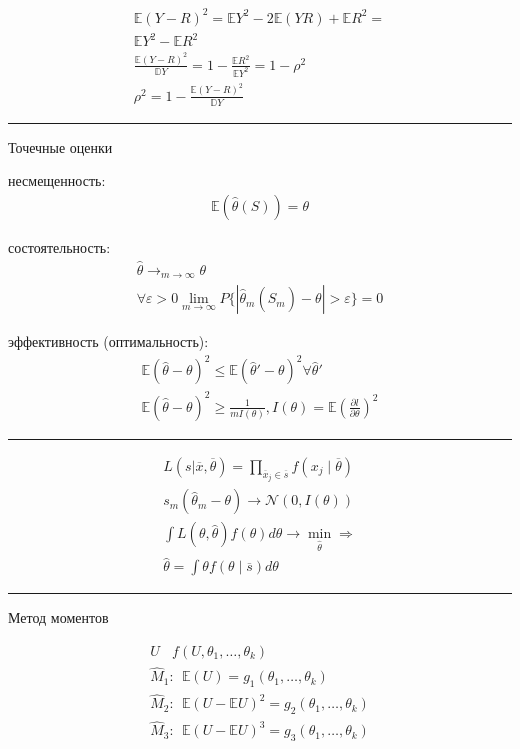 \documentclass{book}
\begin{document}
\begin{gather*}
  \mathbb{E}(Y-R)^2=\mathbb{E}Y^2-2\mathbb{E}(YR)+\mathbb{E}R^2=\\
  \mathbb{E}Y^2-\mathbb{E}R^2\\
  \frac{\mathbb{E}(Y-R)^2}{\mathbb{D}Y}=1-\frac{\mathbb{E}R^2}{\mathbb{E}Y^2}=1-\rho^2\\
  \rho^2=1-\frac{\mathbb{E}(Y-R)^2}{\mathbb{D}Y}
\end{gather*}

\hrule
Точечные оценки

несмещенность: 
\begin{gather*}
  \mathbb{E}(\hat{\theta}(S))=\theta
\end{gather*}

состоятельность: 
\begin{gather*}
  \hat{\theta} \rightarrow_{m\rightarrow\infty}\theta\\
  \forall \varepsilon > 0 \lim_{m\rightarrow \infty} {P\{|\hat{\theta}_m(\hat{S}_m)-\theta|>\varepsilon\}}=0
\end{gather*}

эффективность (оптимальность):
\begin{gather*}
  \mathbb{E}(\hat{\theta}-\theta)^2\leq \mathbb{E}(\hat{\theta}'-\theta)^2 \forall \hat{\theta}'\\
  \mathbb{E}(\hat{\theta}-\theta)^2\geq \frac{1}{mI(\theta)}, I(\theta)=\mathbb{E}\left(\frac{\partial l}{\partial \theta}\right)^2
\end{gather*}

\hrule

\begin{gather*}
  L(s|\overline{x},\overline{\theta})=\prod_{\overline{x}_j \in \overline{s}}^{} {f(x_j\mid \overline{\theta})}\\
  s_m(\hat{\theta}_m-\theta) \rightarrow \mathcal{N}(0, I(\theta))\\
  \int {L(\theta,\hat{\theta})f(\theta)d\theta} \rightarrow \min_{\hat{\theta}} \Rightarrow\\
  \hat{\theta}=\int {\theta f(\theta\mid \overline{s}) d\theta}
\end{gather*}

\hrule
Метод моментов

\begin{gather*}
  U~~~~f(U,\theta_1,\dots,\theta_k)\\
  \hat{M}_1:~~\mathbb{E}(U)=g_1(\theta_1,\dots, \theta_k)\\
  \hat{M}_2:~~\mathbb{E}(U-\mathbb{E}U)^2=g_2(\theta_1,\dots, \theta_k)\\
  \hat{M}_3:~~\mathbb{E}(U-\mathbb{E}U)^3=g_3(\theta_1,\dots, \theta_k)
\end{gather*}
\end{document}
